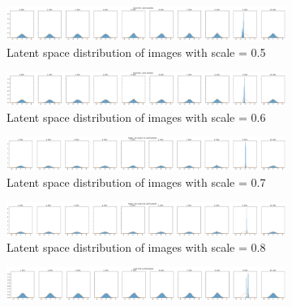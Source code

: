 \begin{figure}
    \centering
    \begin{subfigure}{\textwidth}
        \centering
        \includegraphics[width=\textwidth]{images/latent_space_entanglement/vae_dsprites_lf_10000_dist_scale_0_5.png}
        \caption{Latent space distribution of images with scale = 0.5}
    \end{subfigure}
    \begin{subfigure}{\textwidth}
        \centering
        \includegraphics[width=\textwidth]{images/latent_space_entanglement/vae_dsprites_lf_10000_dist_scale_0_6.png}
        \caption{Latent space distribution of images with scale = 0.6}
    \end{subfigure}
    \begin{subfigure}{\textwidth}
        \centering
        \includegraphics[width=\textwidth]{images/latent_space_entanglement/vae_dsprites_lf_10000_dist_scale_0_7.png}
        \caption{Latent space distribution of images with scale = 0.7}
    \end{subfigure}
    \begin{subfigure}{\textwidth}
        \centering
        \includegraphics[width=\textwidth]{images/latent_space_entanglement/vae_dsprites_lf_10000_dist_scale_0_8.png}
        \caption{Latent space distribution of images with scale = 0.8}
    \end{subfigure}
    \begin{subfigure}{\textwidth}
        \centering
        \includegraphics[width=\textwidth]{images/latent_space_entanglement/vae_dsprites_lf_10000_dist_scale_0_9.png}

\end{subfigure}
\end{figure}
